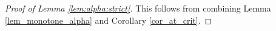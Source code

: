\documentclass[pdflatex,sn-mathphys-num]{sn-jnl}%
\newcommand{\1}{{\ensuremath{\mathbf{1}}} }
\theoremstyle{thmstyleone}%
\theoremstyle{thmstyletwo}%
\theoremstyle{thmstylethree}%
\begin{document}
\begin{proof}[Proof of Lemma \ref{lem:alpha:strict}]
This follows from combining Lemma \ref{lem_monotone_alpha} and Corollary \ref{cor_at_crit}.
\end{proof}
























\end{document}

